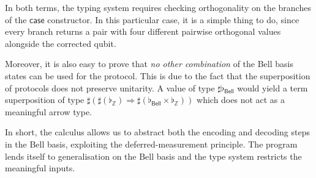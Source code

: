 \documentclass[a4paper,UKenglish,numberwithinsect,pdfa,anonymous]{lipics-v2021}
\theoremstyle{restatestyle}
\def\Arr{\Rightarrow}
\newcommand\B{\mathbb Z}
\newcommand{\Bell}{\mathsf{Bell}}
\newcommand\basis[1]{\ensuremath{\flat_{#1}}}
\begin{document}
In both terms, the typing system requires checking orthogonality on the branches of
the $\mathsf{case}$ constructor. In this particular case, it is a simple thing to 
do, since every branch returns a pair with four different pairwise orthogonal values
alongside the corrected qubit. 

Moreover, it is also easy to prove that \emph{no other combination} of the Bell 
basis states can be used for the protocol. This is due to the fact that the 
superposition of protocols does not preserve unitarity. A value of type 
$\sharp\basis{\Bell}$ would yield a term superposition of type $\sharp(\sharp 
(\basis{\B})\Arr\sharp (\basis{\Bell}\times\basis{\B}))$ which does not act as a 
meaningful arrow type.

In short, the calculus allows us to abstract both the encoding and decoding
steps in the Bell basis, exploiting the deferred-measurement principle. The program 
lends itself to generalisation on the Bell basis and the type system restricts the meaningful inputs.
\end{document}
